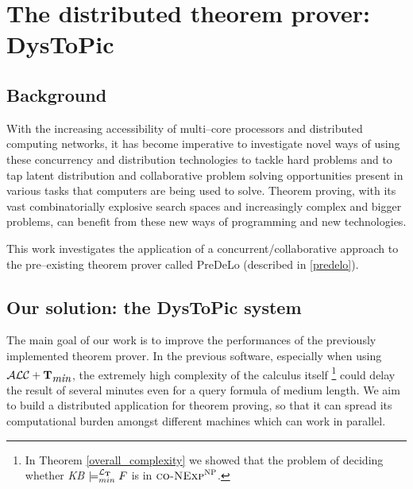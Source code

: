 \documentclass[a4paper, 11pt, oneside]{duthesis}
\newcommand{\tip}{{\bf T}}
\newcommand{\alctmin}{\mathcal{ALC}+\tip_{\mbox{\em min}}}
\newcommand{\ellet} {\mathcal{L}_{\bf T}}
\begin{document}
\newpage

























\chapter{The distributed theorem prover: DysToPic}\label{chap_dystopic}
\section{Background}\label{bg}
With the increasing accessibility of multi--core processors and distributed computing networks, it has become imperative to investigate novel ways of using these concurrency and distribution technologies to tackle hard problems and to tap latent distribution and collaborative problem solving opportunities present in various tasks that computers are being used to solve.
Theorem proving, with its vast combinatorially explosive search spaces and increasingly complex and bigger problems, can benefit from these new ways of programming and new technologies\cite{conf/ieeehpcs/SripriyaBS09}.


This work investigates the application of a concurrent/collaborative approach to the pre--existing theorem prover called PreDeLo (described in \ref{predelo}).




\section{Our solution: the DysToPic system}



The main goal of our work is to improve the performances of the previously implemented theorem prover.
In the previous software, especially when using $\alctmin$, the extremely high complexity of the calculus itself
\footnote{In Theorem \ref{overall_complexity} we showed that the problem of deciding whether \emph{KB} $\models_{min}^{\ellet} F$ is in $\textsc{co-NExp}^\textsc{NP}$.}
could delay the result of several minutes even for a query formula of medium length.
We aim to build a distributed application for theorem proving, so that it can spread its computational burden amongst different machines which can work in parallel.
\end{document}
